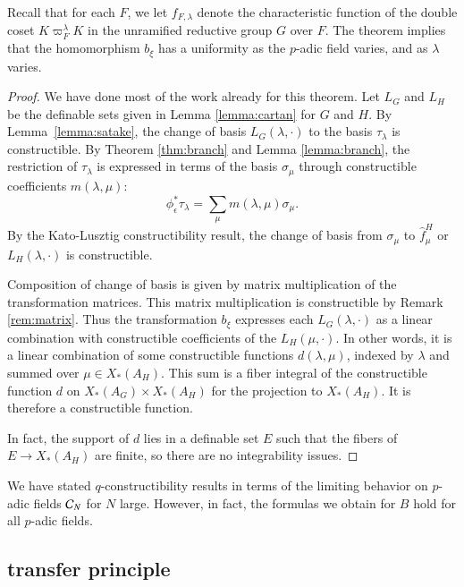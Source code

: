 Recall that for each $F$, we let $f_{F,\lambda}$ denote the
characteristic function of the double coset $K\varpi_F^\lambda K$ in
the unramified reductive group $G$ over $F$.  The theorem implies that
the homomorphism $b_\xi$ has a uniformity as the $p$-adic field
varies, and as $\lambda$ varies.

\begin{proof}
  We have done most of the work already for this theorem.  Let $L_G$
  and $L_H$ be the definable sets given in Lemma \ref{lemma:cartan}
  for $G$ and $H$.  By Lemma~\ref{lemma:satake}, the change of basis
  $L_G(\lambda,\cdot)$ to the basis $\tau_\lambda$ is constructible.
  By Theorem \ref{thm:branch} and Lemma \ref{lemma:branch}, the
  restriction of $\tau_\lambda$ is expressed in terms of the basis
  $\sigma_\mu$ through constructible coefficients $m(\lambda,\mu)$:
\[
\phi^*_\epsilon\tau_\lambda = \sum_{\mu} m(\lambda,\mu) \sigma_\mu.
\]
By the Kato-Lusztig constructibility result, the change of basis from
$\sigma_\mu$ to $\hat f^H_\mu$ or $L_H(\lambda,\cdot)$ is
constructible.
% 

Composition of change of basis is given
by matrix multiplication of the transformation matrices.  This matrix
multiplication is constructible by Remark \ref{rem:matrix}.  Thus the
transformation $b_\xi$ expresses each $L_G(\lambda,\cdot)$ as a linear
combination with constructible coefficients of the $L_H(\mu,\cdot)$.
In other words, it is a linear combination of some constructible
functions $d(\lambda,\mu)$, indexed by $\lambda$ and summed over
$\mu\in X_*(A_H)$.  This sum is a fiber integral of the constructible
function $d$ on $X_*(A_G)\times X_*(A_H)$ for the projection to
$X_*(A_H)$.  It is therefore a constructible function.

In fact, the support of $d$ lies in a definable set $E$ such that the
fibers of $E\to X_*(A_H)$ are finite, so there are no integrability
issues.
\end{proof}

\begin{remark}  
  We have stated $q$-constructibility results in terms of the limiting
  behavior on $p$-adic fields $\mathcal C_N$ for $N$ large.  However, in fact,
  the formulas we obtain for $B$ hold for all $p$-adic fields.
\end{remark}


\subsection{transfer principle}

